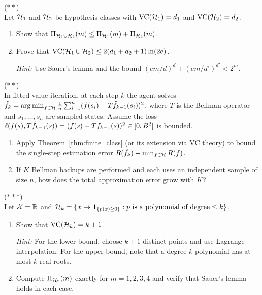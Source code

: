 \documentclass[11pt,a4paper]{article}
\begin{document}
\begin{exercise}
\textnormal{(\(\ast\ast\))} \\
Let $\mathcal{H}_1$ and $\mathcal{H}_2$ be hypothesis classes with
$\operatorname{VC}(\mathcal{H}_1) = d_1$ and $\operatorname{VC}(\mathcal{H}_2) = d_2$.
\begin{enumerate}[nosep,label=(\alph*)]
    \item Show that $\Pi_{\mathcal{H}_1 \cup \mathcal{H}_2}(m) \leq
    \Pi_{\mathcal{H}_1}(m) + \Pi_{\mathcal{H}_2}(m)$.
    \item Prove that $\operatorname{VC}(\mathcal{H}_1 \cup \mathcal{H}_2) \leq
    2(d_1 + d_2 + 1) \ln(2e)$.

    \textit{Hint:} Use Sauer's lemma and the bound
    $(em/d)^d + (em/d')^{d'} < 2^m$.
\end{enumerate}
\end{exercise}

\begin{exercise}
\textnormal{(\(\ast\ast\))} \\
In fitted value iteration, at each step $k$ the agent solves
$\hat{f}_k = \operatorname{arg\,min}_{f \in \mathcal{H}} \frac{1}{n}\sum_{i=1}^n
(f(s_i) - T\hat{f}_{k-1}(s_i))^2$, where $T$ is the Bellman
operator and $s_1, \ldots, s_n$ are sampled states.  Assume the loss
$\ell(f(s), T\hat{f}_{k-1}(s)) = (f(s) - T\hat{f}_{k-1}(s))^2
\in [0, B^2]$ is bounded.
\begin{enumerate}[nosep,label=(\alph*)]
    \item Apply Theorem~\ref{thm:finite_class} (or its extension via
    VC theory) to bound the single-step estimation error
    $R(\hat{f}_k) - \min_{f \in \mathcal{H}} R(f)$.
    \item If $K$ Bellman backups are performed and each uses an
    independent sample of size $n$, how does the total approximation
    error grow with $K$?
\end{enumerate}
\end{exercise}

\begin{exercise}
\textnormal{(\(\ast\ast\ast\))} \\
Let $\mathcal{X} = \mathbb{R}$ and $\mathcal{H}_k = \{x \mapsto
\mathbf{1}_{\{p(x) \geq 0\}} : p \text{ is a polynomial of degree}
\leq k\}$.
\begin{enumerate}[nosep,label=(\alph*)]
    \item Show that $\operatorname{VC}(\mathcal{H}_k) = k + 1$.

    \textit{Hint:} For the lower bound, choose $k + 1$ distinct
    points and use Lagrange interpolation.  For the upper bound,
    note that a degree-$k$ polynomial has at most $k$ real roots.
    \item Compute $\Pi_{\mathcal{H}_2}(m)$ exactly for $m = 1, 2, 3, 4$
    and verify that Sauer's lemma holds in each case.
\end{enumerate}
\end{exercise}
\end{document}
